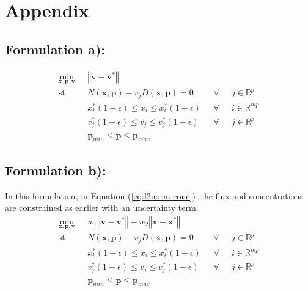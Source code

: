 \documentclass[10pt]{article}
\begin{document}
	\section{Appendix}
	\subsection{Formulation a):}		
	\begin{subequations}\label{eq:l2norm-flux}
		\begin{align}
		\underset{\mathbf{x},\mathbf{p},\mathbf{v}}{\mathrm{min}} & \text{      }\left\Vert \mathbf{v}-\mathbf{v}^*\right\Vert\\
		\mathrm{st}& \text{      }N(\mathbf{x},\mathbf{p}) - v_jD(\mathbf{x},\mathbf{p}) = 0 & \text{  }\forall & \text{ }j\in\mathbb{R}^p\\
		& \text{      }x^*_i(1-\epsilon)\le x_i \le x^*_i(1+\epsilon) & \text{  }\forall & \text{ }i\in\mathbb{R}^{mp}\\	
		& \text{      }v^*_j(1-\epsilon)\le v_j \le v^*_j(1+\epsilon) & \text{  }\forall & \text{ }j\in\mathbb{R}^{p}\\		
		& \text{      }\mathbf{p}_{min} \le \mathbf{p} \le \mathbf{p}_{max}
		\end{align}
	\end{subequations}
	
	\subsection{Formulation b):}	
	In this formulation, in Equation (\ref{eq:l2norm-conc}), the flux and concentrations are constrained as earlier with an uncertainty term.	
	\begin{subequations}\label{eq:l2norm-conc}
		\begin{align}
		\underset{\mathbf{x},\mathbf{p},\mathbf{v}}{\mathrm{min}} & \text{      }w_1\left\Vert \mathbf{v}-\mathbf{v}^*\right\Vert + w_2\left\Vert \mathbf{x}-\mathbf{x}^*\right\Vert\\
		\mathrm{st}& \text{      }N(\mathbf{x},\mathbf{p}) - v_jD(\mathbf{x},\mathbf{p}) = 0 & \text{  }\forall & \text{ }j\in\mathbb{R}^p\\
		& \text{      }x^*_i(1-\epsilon)\le x_i \le x^*_i(1+\epsilon) & \text{  }\forall & \text{ }i\in\mathbb{R}^{mp}\\	
		& \text{      }v^*_j(1-\epsilon)\le v_j \le v^*_j(1+\epsilon) & \text{  }\forall & \text{ }j\in\mathbb{R}^{p}\\		
		& \text{      }\mathbf{p}_{min} \le \mathbf{p} \le \mathbf{p}_{max}
		\end{align}
	\end{subequations}	
	
\end{document}
